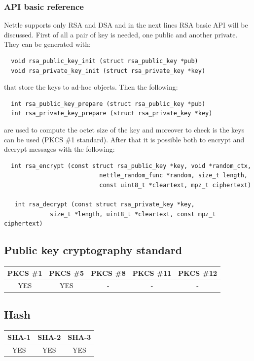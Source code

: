 \subsubsection*{API basic reference}
Nettle supports only RSA and DSA and in the next lines RSA basic API will be discussed. First of all a pair of key is needed, one public and another private. They can be generated with:
\begin{verbatim}
  void rsa_public_key_init (struct rsa_public_key *pub)
  void rsa_private_key_init (struct rsa_private_key *key)
\end{verbatim}
that store the keys to ad-hoc objects. Then the following:
\begin{verbatim}
  int rsa_public_key_prepare (struct rsa_public_key *pub)
  int rsa_private_key_prepare (struct rsa_private_key *key)
\end{verbatim}
are used to compute the octet size of the key and moreover to check is the keys can be used (PKCS \#1 standard). After that it is possible both to encrypt and decrypt messages with the following:
\begin{verbatim}
  int rsa_encrypt (const struct rsa_public_key *key, void *random_ctx,
                           nettle_random_func *random, size_t length,
                           const uint8_t *cleartext, mpz_t ciphertext)
                           
   int rsa_decrypt (const struct rsa_private_key *key,
             size_t *length, uint8_t *cleartext, const mpz_t ciphertext)                           
\end{verbatim}
\newpage

\subsection{Public key cryptography standard}
\begin{table}[!ht]
	\begin{tabular}{|| c | c | c | c | c ||}
		\textbf{PKCS \#1} & \textbf{PKCS \#5} & \textbf{PKCS \#8}  & \textbf{PKCS \#11} & \textbf{PKCS \#12} \\
		\hline \hline
		YES & YES & - & - & - \\
	\end{tabular}
\end{table}

\subsection{Hash}
\begin{table}[!ht]
	\begin{tabular}{|| c | c | c ||}
		\textbf{SHA-1} & \textbf{SHA-2} & \textbf{SHA-3} \\
		\hline \hline
		YES & YES & YES \\
	\end{tabular}
\end{table}

